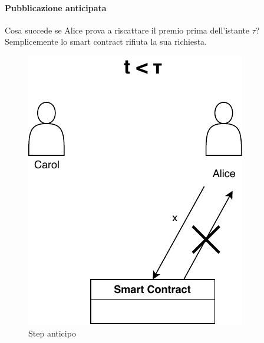 \paragraph{Pubblicazione anticipata}
Cosa succede se Alice prova a riscattare il premio prima dell'istante $ \tau $?
Semplicemente lo smart contract rifiuta la sua richiesta.
\begin{figure}[H]
	\centering
	\includegraphics[width=0.3\linewidth]{images/chap_protocollo/base-anticipo.pdf}
	\caption{Step anticipo}
\end{figure}

